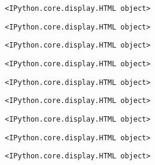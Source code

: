     
    \begin{Verbatim}[commandchars=\\\{\}]
<IPython.core.display.HTML object>
    \end{Verbatim}

    
    
    \begin{Verbatim}[commandchars=\\\{\}]
<IPython.core.display.HTML object>
    \end{Verbatim}

    
    
    \begin{Verbatim}[commandchars=\\\{\}]
<IPython.core.display.HTML object>
    \end{Verbatim}

    
    
    \begin{Verbatim}[commandchars=\\\{\}]
<IPython.core.display.HTML object>
    \end{Verbatim}

    
    
    \begin{Verbatim}[commandchars=\\\{\}]
<IPython.core.display.HTML object>
    \end{Verbatim}

    
    
    \begin{Verbatim}[commandchars=\\\{\}]
<IPython.core.display.HTML object>
    \end{Verbatim}

    
    
    \begin{Verbatim}[commandchars=\\\{\}]
<IPython.core.display.HTML object>
    \end{Verbatim}

    
    
    \begin{Verbatim}[commandchars=\\\{\}]
<IPython.core.display.HTML object>
    \end{Verbatim}

    
    
    \begin{Verbatim}[commandchars=\\\{\}]
<IPython.core.display.HTML object>
    \end{Verbatim}

